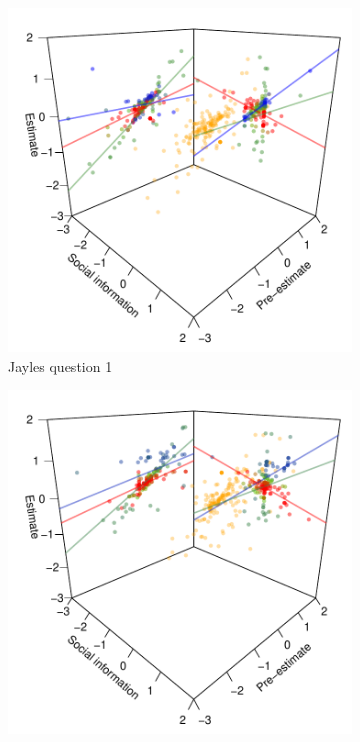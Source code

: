 \documentclass[9pt,twoside,lineno]{pnas-new}
\begin{document}
\begin{figure}[htbp]
	\centering
	\begin{subfigure}[b]{.24\textwidth}
		\includegraphics[width=\textwidth]{../plots/jayles1_vs_xp3d.pdf}
		\caption{Jayles question 1}
	\end{subfigure}
	\begin{subfigure}[b]{.24\textwidth}
		\includegraphics[width=\textwidth]{../plots/jayles2_vs_xp3d.pdf}

\end{subfigure}
\end{figure}
\end{document}
